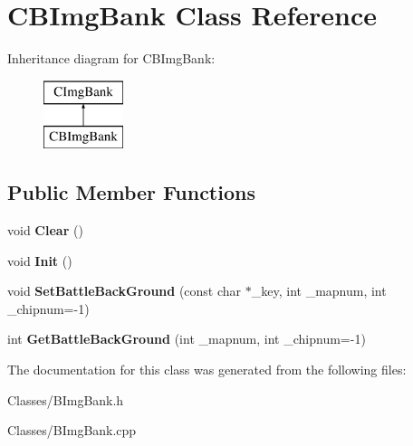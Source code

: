 \hypertarget{class_c_b_img_bank}{}\section{C\+B\+Img\+Bank Class Reference}
\label{class_c_b_img_bank}
Inheritance diagram for C\+B\+Img\+Bank\+:\begin{figure}[H]
\begin{center}
\leavevmode
\includegraphics[height=2.000000cm]{class_c_b_img_bank}
\end{center}
\end{figure}
\subsection*{Public Member Functions}
\begin{DoxyCompactItemize}
\item 
void {\bfseries Clear} ()\hypertarget{class_c_b_img_bank_a9b6909dc6a06cba16e4ded1b78a9e707}{}\label{class_c_b_img_bank_a9b6909dc6a06cba16e4ded1b78a9e707}

\item 
void {\bfseries Init} ()\hypertarget{class_c_b_img_bank_ac01c6432a7e24ef726c829adc1c6c1b1}{}\label{class_c_b_img_bank_ac01c6432a7e24ef726c829adc1c6c1b1}

\item 
void {\bfseries Set\+Battle\+Back\+Ground} (const char $\ast$\+\_\+key, int \+\_\+mapnum, int \+\_\+chipnum=-\/1)\hypertarget{class_c_b_img_bank_a2efb5a1f7dec0e85b37afc470e63f039}{}\label{class_c_b_img_bank_a2efb5a1f7dec0e85b37afc470e63f039}

\item 
int {\bfseries Get\+Battle\+Back\+Ground} (int \+\_\+mapnum, int \+\_\+chipnum=-\/1)\hypertarget{class_c_b_img_bank_a44a9e2fdb0fa2bf79fae1ada748523b1}{}\label{class_c_b_img_bank_a44a9e2fdb0fa2bf79fae1ada748523b1}

\end{DoxyCompactItemize}


The documentation for this class was generated from the following files\+:\begin{DoxyCompactItemize}
\item 
Classes/B\+Img\+Bank.\+h\item 
Classes/B\+Img\+Bank.\+cpp\end{DoxyCompactItemize}

